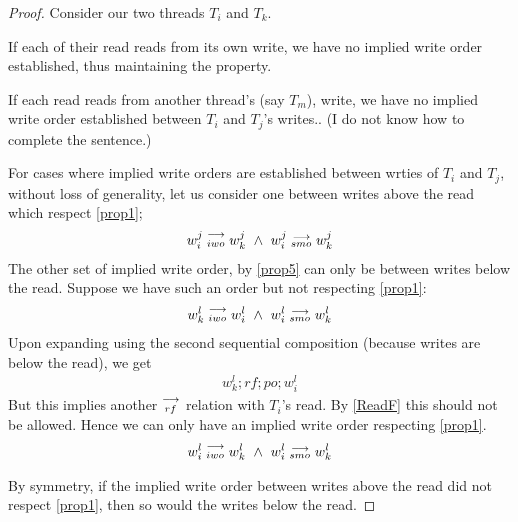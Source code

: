     \begin{proof}
        
        Consider our two threads $T_i$ and $T_k$. 

        If each of their read reads from its own write, we have no implied write order established, thus maintaining the property.
        
        If each read reads from another thread's (say $T_m$), write, we have no implied write order established between $T_i$ and $T_j$'s writes.. (I do not know how to complete the sentence.)

        For cases where implied write orders are established between wrties of $T_i$ and $T_j$, without loss of generality, let us consider one between writes above the read which respect \ref{prop1}; 
        \begin{align}
            w_i^j\stackrel{\longrightarrow}{_{iwo}}w_k^j \ \wedge \ w_i^j\stackrel{\longrightarrow}{_{smo}}w_k^j
        \end{align}
        The other set of implied write order, by \ref{prop5} can only be between writes below the read. Suppose we have such an order but not respecting \ref{prop1}:
        \begin{align}
            w_k^l\stackrel{\longrightarrow}{_{iwo}}w_i^l \ \wedge \ w_i^l\stackrel{\longrightarrow}{_{smo}}w_k^l
        \end{align}
        Upon expanding using the second sequential composition (because writes are below the read), we get
        \begin{align}
            w_k^l;rf;po;w_i^l 
        \end{align}
        But this implies another $\stackrel{\longrightarrow}{_{rf}}$ relation with $T_i$'s read. By \ref{ReadF} this should not be allowed. Hence we can only have an implied write order respecting \ref{prop1}.
        \begin{align}
            w_i^l\stackrel{\longrightarrow}{_{iwo}}w_k^l \ \wedge \ w_i^l\stackrel{\longrightarrow}{_{smo}}w_k^l
        \end{align}


        By symmetry, if the implied write order between writes above the read did not respect \ref{prop1}, then so would the writes below the read.  
    \end{proof}

        
